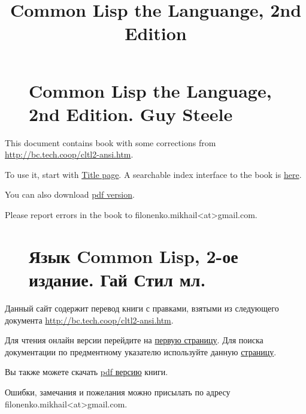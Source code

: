 \documentclass{article}
\title{Common Lisp the Languange, 2nd Edition}
\begin{document}
\begin{figure}
\href{./en/clm.html}{} \section*{Common Lisp the Language, 2nd Edition. Guy Steele}
\end{figure}

This document contains book with some corrections from
\url{http://bc.tech.coop/cltl2-ansi.htm}.

To use it, start with \href{./en/clm.html}{Title page}. A searchable index
interface to the book is \href{./en/symbols.html}{here}.

You can also download \href{./enpdf/cltl2.pdf}{pdf version}.

Please report errors in the book to filonenko.mikhail<at>gmail.com.

\begin{figure}
\href{./ru/clm.html}{} \section*{Язык Common Lisp, 2-ое издание. Гай Стил мл.}
\end{figure}

Данный сайт содержит перевод книги с правками, взятыми из следующего документа
\url{http://bc.tech.coop/cltl2-ansi.htm}.

Для чтения онлайн версии перейдите на  \href{./ru/clm.html}{первую страницу}.
Для поиска документации по предментному указателю используйте данную \href{./ru/symbols.html}{страницу}.

Вы также можете скачать \href{./rupdf/cltl2.pdf}{pdf версию} книги.

Ошибки, замечания и пожелания можно присылать по адресу filonenko.mikhail<at>gmail.com.
\end{document}
